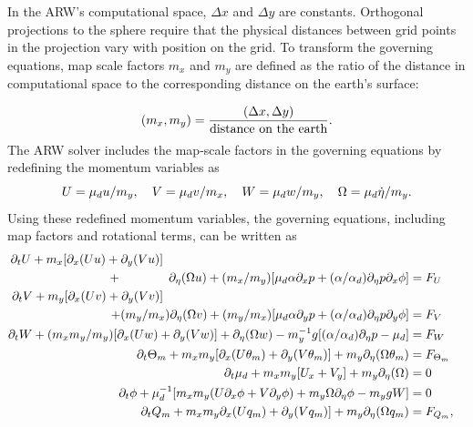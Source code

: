 In the ARW's computational space, $\Delta x$ and $\Delta y$ are
constants.  Orthogonal projections to the sphere require that
the physical distances between grid points in the projection vary with
position on the grid.  To transform the governing equations,
map scale factors $m_x$ and $m_y$ are defined as the ratio of the distance 
in computational space to the corresponding distance on the earth's surface:

\begin{equation}
(m_x,m_y) = {(\Delta x, \Delta y) \over \hbox{distance on the earth}}.
\end{equation}
%
\noindent
The ARW solver includes the map-scale factors in the governing equations
by redefining the momentum variables as
%
\begin{equation}
U = {\mu}_d u/m_y,~~~V = {\mu}_d v/m_x, ~~~W = \mu_d w / m_y, 
~~~\Omega = \mu_d \dot\eta /m_y.
\notag
\end{equation}
%
\noindent
Using these redefined momentum variables, 
the governing equations, including map factors and rotational terms, 
can be written as
%
\begin{align}
\partial_t U + m_x[\partial_x(Uu) + \partial_y(Vu)] \hphantom{\quad\quad\quad\quad\quad\quad\quad\quad\quad\quad\quad\quad\quad\quad\quad\quad\quad\quad\quad\quad}
\notag \\ 
+ \hphantom{(m_y/m_x)} 
\partial_\eta (\Omega u)
+ (m_x/m_y)[\mu_d \alpha \partial_x p
+ (\alpha/\alpha_d) \partial_\eta p \partial_x \phi] & = F_U
\label{u-mom-full}
\\
%
\partial_t V + m_y[\partial_x (Uv) + \partial_y (Vv)] \hphantom{\quad\quad\quad\quad\quad\quad\quad\quad\quad\quad\quad\quad\quad\quad\quad\quad\quad\quad\quad\quad}
\notag \\ + (m_y/m_x)\partial_\eta (\Omega v)
+ (m_y/m_x)[\mu_d \alpha \partial_y p
+ (\alpha/\alpha_d) \partial_\eta p \partial_y \phi] & = F_V
\label{v-mom-full}
\\
%
\partial_t W + (m_x m_y/m_y) [\partial_x (Uw) + \partial_y (Vw)] + \partial_\eta (\Omega w)
- m_y^{-1} g [ (\alpha/\alpha_d) \partial_\eta p - \mu_d ] & = F_W 
\label{w-mom-full}
\\
%
\partial_t \Theta_m + 
m_x m_y[\partial_x (U\theta_m) + \partial_y (V\theta_m)] + m_y \partial_\eta (\Omega \theta_m)
& = F_{\Theta_m} \\
%
\partial_t \mu_d + m_x m_y[U_x + V_y] + m_y \partial_\eta (\Omega)
& = 0 
\label{mass-cons-full}
\\
%
\partial_t \phi + \mu_d^{-1} [m_x m_y (U\partial_x\phi + V\partial_y\phi) + m_y
\Omega\partial_\eta\phi - m_y gW ] & = 0
\label{geo-full}
\\
%
\partial_t Q_m + 
m_x m_y \partial_x (U q_m) + \partial_y (V q_m)] + m _y\partial_\eta (\Omega q_m)
& = F_{Q_m},
%
\end{align}
